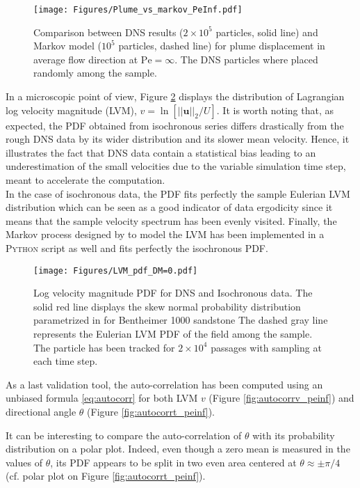 \begin{figure}[h!]
	\centering
	\texttt{[image: Figures/Plume\_vs\_markov\_PeInf.pdf]}
	\caption{Comparison between DNS results ($2\times 10^5$ particles, solid line) and Markov model ($10^5$ particles, dashed line) for plume displacement in average flow direction at $\mathrm{Pe}=\infty$. The DNS particles where placed randomly among the sample.}
	\label{fig:plume_peinf}
\end{figure}

In a microscopic point of view, Figure \ref{fig:lvm_pdf_peinf} displays the distribution of Lagrangian log velocity magnitude (LVM), $v = \ln[||\textbf{u}||_2/U]$. 
It is worth noting that, as expected, the PDF obtained from isochronous series differs drastically from the rough DNS data by its wider distribution and its slower mean velocity.
Hence, it illustrates the fact that DNS data contain a statistical bias leading to an underestimation of the small velocities due to the variable simulation time step, meant to accelerate the computation.\\
In the case of isochronous data, the PDF fits perfectly the sample Eulerian LVM distribution which can be seen as a good indicator of data ergodicity since it means that the sample velocity spectrum has been evenly visited.
Finally, the Markov process designed by \cite{Meyer2016} to model the LVM has been implemented in a \textsc{Python} script as well and fits perfectly the isochronous PDF.

\begin{figure}
	\centering
	\texttt{[image: Figures/LVM\_pdf\_DM=0.pdf]}
	\caption{Log velocity magnitude PDF for DNS and Isochronous data. The solid red line displays the skew normal probability distribution parametrized in \citet{Meyer2016} for Bentheimer 1000 sandstone The dashed gray line represents the Eulerian LVM PDF of the field among the sample. The particle has been tracked for $2\times 10^4$ passages with sampling at each time step.}
	\label{fig:lvm_pdf_peinf}
\end{figure}

As a last validation tool, the auto-correlation has been computed using an unbiased formula \eqref{eq:autocorr} for both LVM $v$ (Figure \ref{fig:autocorrv_peinf}) and directional angle $\theta$ (Figure \ref{fig:autocorrt_peinf}). 

It can be interesting to compare the auto-correlation of $\theta$ with its probability distribution on a polar plot. 
Indeed, even though a zero mean is measured in the values of $\theta$, its PDF appears to be split in two even area centered at $\theta\approx\pm\pi/4$ (cf. polar plot on Figure \ref{fig:autocorrt_peinf}).


